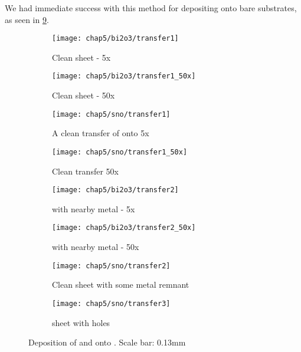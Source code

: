 \documentclass[../Matt_Gebert_Honours_Thesis.tex]{subfiles}
\begin{document}
	We had immediate success with this method for depositing onto bare substrates, as seen in \cref{fig:transfer_bi&sno_on_si}.
	\begin{figure}[H]
		\begin{subfigure}[t]{0.24\textwidth}
			\centering
			\texttt{[image: chap5/bi2o3/transfer1]}
			\caption{Clean \bismuthoxide{} sheet - 5x}\label{fig:bi2o3_1}
		\end{subfigure}
		\begin{subfigure}[t]{0.24\textwidth}
			\centering
			\texttt{[image: chap5/bi2o3/transfer1\_50x]}
			\caption{Clean \bismuthoxide{} sheet - 50x}\label{fig:bi2o3_2}
		\end{subfigure}
		\begin{subfigure}[t]{0.24\textwidth}
			\centering
			\texttt{[image: chap5/sno/transfer1]}
			\caption[\tinoxide{} transfer on \silicondioxide{}]{A clean transfer of \tinoxide{} onto \silicondioxide{} 5x}\label{fig:sno_1}
		\end{subfigure}
		\begin{subfigure}[t]{0.24\textwidth}
			\centering
			\texttt{[image: chap5/sno/transfer1\_50x]}
			\caption{Clean \tinoxide{} transfer 50x}\label{fig:sno_2}
		\end{subfigure}
		\begin{subfigure}[t]{0.24\textwidth}
			\centering
			\texttt{[image: chap5/bi2o3/transfer2]}
			\caption{\bismuthoxide{} with nearby metal - 5x}\label{fig:bi2o3_3}
		\end{subfigure}
		\begin{subfigure}[t]{0.24\textwidth}
			\centering
			\texttt{[image: chap5/bi2o3/transfer2\_50x]}
			\caption{\bismuthoxide{} with nearby metal - 50x}\label{fig:bi2o3_4}
		\end{subfigure}
		\begin{subfigure}[t]{0.24\textwidth}
			\centering
			\texttt{[image: chap5/sno/transfer2]}
			\caption{Clean \tinoxide{} sheet with some metal remnant}\label{fig:sno_3}
		\end{subfigure}
		\begin{subfigure}[t]{0.24\textwidth}
			\centering
			\texttt{[image: chap5/sno/transfer3]}
			\caption{\tinoxide{} sheet with holes}\label{fig:sno_4}
		\end{subfigure}
		\caption[\bismuthoxide{} and \tinoxide{} stamped on \silicondioxide{}]{Deposition of \bismuthoxide{} and \tinoxide{} onto \silicondioxide{}. Scale bar: 0.13mm}\label{fig:transfer_bi&sno_on_si}
	\end{figure}
	
\end{document}
